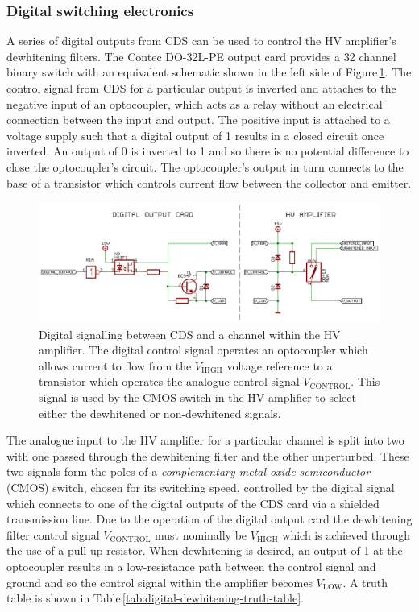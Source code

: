 \subsubsection{Digital switching electronics}
A series of digital outputs from \gls{CDS} can be used to control the \gls{HV} amplifier's dewhitening filters. The Contec DO-32L-PE output card provides a 32 channel binary switch with an equivalent schematic shown in the left side of Figure\,\ref{fig:hv-amp-sigital-switching}. The control signal from \gls{CDS} for a particular output is inverted and attaches to the negative input of an optocoupler, which acts as a relay without an electrical connection between the input and output. The positive input is attached to a voltage supply such that a digital output of \num{1} results in a closed circuit once inverted. An output of \num{0} is inverted to \num{1} and so there is no potential difference to close the optocoupler's circuit. The optocoupler's output in turn connects to the base of a transistor which controls current flow between the collector and emitter.

\begin{figure}
  \centering
  \includegraphics[width=\columnwidth]{graphics/60-hv-amp-digital-switching.pdf}
  \caption[Digital signalling between the control and data acquisition system and a channel within the high voltage amplifier]{\label{fig:hv-amp-sigital-switching}Digital signalling between \gls{CDS} and a channel within the \gls{HV} amplifier. The digital control signal operates an optocoupler which allows current to flow from the $V_{\text{HIGH}}$ voltage reference to a transistor which operates the analogue control signal $V_{\text{CONTROL}}$. This signal is used by the \gls{CMOS} switch in the \gls{HV} amplifier to select either the dewhitened or non-dewhitened signals.}
\end{figure}

The analogue input to the \gls{HV} amplifier for a particular channel is split into two with one passed through the dewhitening filter and the other unperturbed. These two signals form the poles of a \emph{complementary metal-oxide semiconductor} (\gls{CMOS}) switch, chosen for its switching speed, controlled by the digital signal which connects to one of the digital outputs of the \gls{CDS} card via a shielded transmission line. Due to the operation of the digital output card the dewhitening filter control signal $V_{\text{CONTROL}}$ must nominally be $V_{\text{HIGH}}$ which is achieved through the use of a pull-up resistor. When dewhitening is desired, an output of \num{1} at the optocoupler results in a low-resistance path between the control signal and ground and so the control signal within the amplifier becomes $V_{\text{LOW}}$. A truth table is shown in Table\,\ref{tab:digital-dewhitening-truth-table}.

